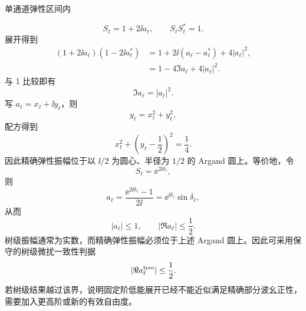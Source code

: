 \begin{derivation}
单通道弹性区间内

\begin{equation*}
 S_\ell=1+2\ii a_\ell,
 \qquad
 S_\ell S_\ell^*=1.
\end{equation*}
展开得到
\begin{align*}
 (1+2\ii a_\ell)(1-2\ii a_\ell^*)
 &=1+2\ii(a_\ell-a_\ell^*)+4|a_\ell|^2,\\
 &=1-4\Im a_\ell+4|a_\ell|^2.
\end{align*}
与 1 比较即有
\begin{equation*}
 \Im a_\ell=|a_\ell|^2.
\end{equation*}
写 \(a_\ell=x_\ell+\ii y_\ell\)，则
\begin{equation*}
 y_\ell=x_\ell^2+y_\ell^2,
\end{equation*}
配方得到
\begin{equation*}
 x_\ell^2+\left(y_\ell-\frac12\right)^2=\frac14.
\end{equation*}
因此精确弹性振幅位于以 \(\ii/2\) 为圆心、半径为 \(1/2\) 的 Argand 圆上。等价地，令
\begin{equation*}
 S_\ell=\ee^{2\ii\delta_\ell},
\end{equation*}
则
\begin{equation*}
 a_\ell
 =\frac{\ee^{2\ii\delta_\ell}-1}{2\ii}
 =\ee^{\ii\delta_\ell}\sin\delta_\ell,
\end{equation*}
从而
\begin{equation*}
 |a_\ell|\le1,
 \qquad
 |\Re a_\ell|\le\frac12.
\end{equation*}
树级振幅通常为实数，而精确弹性振幅必须位于上述 Argand 圆上。因此可采用保守的树级微扰一致性判据
\begin{equation*}
|\Re a_\ell^{\rm tree}|\le\frac12.
\end{equation*}
若树级结果越过该界，说明固定阶低能展开已经不能近似满足精确部分波幺正性，需要加入更高阶或新的有效自由度。
\end{derivation}



